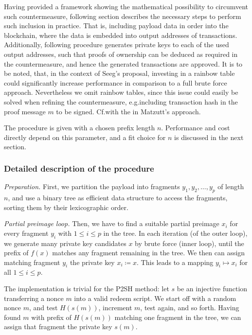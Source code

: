 \documentclass[a4paper,11pt,titlepage]{scrbook}
\begin{document}
Having provided a framework showing the mathematical possibility to circumvent such countermeasure, following section describes the necessary steps to perform such inclusion in practice.
That is, including payload data in order into the blockchain, where the data is embedded into output addresses of transactions.
Additionally, following procedure generates private keys to each of the used output addresses, such that proofs of ownership can be deduced as required in the countermeasure, and hence the generated transactions are approved.
It is to be noted, that, in the context of Seeg's proposal, investing in a rainbow table could significantly increase performance in comparison to a full brute force approach.
Nevertheless we omit rainbow tables, since this issue could easily be solved when refining the countermeasure, e.g.\@ including transaction hash in the proof message $m$ to be signed.
Cf.\@ with the  in Matzutt's approach.

The procedure is given with a chosen prefix length $n$. Performance and cost directly depend on this parameter, and a fit choice for $n$ is discussed in the next section.

\subsubsection*{Detailed description of the procedure}

\emph{Preparation.} First, we partition the payload into fragments $y_1, y_2, \dots, y_p$ of length $n$, and use a binary tree as efficient data structure to access the fragments, sorting them by their lexicographic order.

\emph{Partial preimage loop.} 
Then, we have to find a suitable partial preimage $x_i$ for every fragment $y_i$ with $1\leq i \leq p$ in the tree.
In each iteration (of the outer loop), we generate many private key candidates $x$ by brute force (inner loop), until the prefix of $f(x)$ matches any fragment remaining in the tree.
We then can assign matching fragment $y_i$ the private key $x_i \coloneqq x$.
This leads to a mapping $y_i \mapsto x_i$ for all $1\leq i\leq p$.

The implementation is trivial for the P2SH method: let $s$ be an injective function transferring a nonce $m$ into a valid redeem script.
We start off with a random nonce $m$, and test $H(s(m))$, increment $m$, test again, and so forth.
Having found $m$ with prefix of $H(s(m))$ matching one fragment in the tree, we can assign that fragment the private key $s(m)$.
\end{document}
